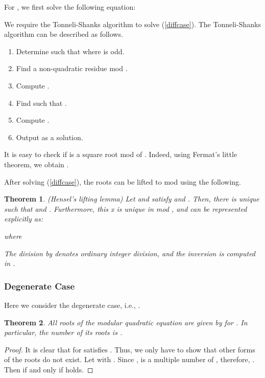 \documentclass{article}
\newtheorem{thm}{Theorem}
\begin{document}
For , we first solve the following equation:


We require the Tonneli-Shanks algorithm to solve (\ref{diffcase}). 
The Tonneli-Shanks algorithm can be described as follows.

{\small
\begin{enumerate}
\item Determine  such that  where  is odd.
\item Find a non-quadratic residue  mod .
\item Compute .
\item Find  such that .
\item Compute .
\item Output  as a solution.
\end{enumerate}
}
It is easy to check if  is a square root mod  of . 
Indeed, using Fermat's little theorem, we obtain 
.

After solving (\ref{diffcase}), the roots can be lifted to mod  using the following.

\begin{thm}(Hensel's lifting lemma) 
Let  and  satisfy 
 and .
Then, there is unique  such that  
and . 
Furthermore, this x is unique in mod , and can be represented explicitly as:

where

The division by  denotes ordinary integer division, 
and the inversion  is computed in .
\end{thm}

\subsubsection{Degenerate Case}
Here we consider the degenerate case, i.e., .

\begin{thm}\label{zerothm}
All roots of the modular quadratic equation  are given by
 for . 
In particular, the number of its roots is .
\end{thm}
\begin{proof} It is clear that  for  satisfies 
. 
Thus, we only have to show that other forms of the roots do not exist. 
Let  with . Since ,  is a multiple number of , 
therefore, . 
Then  if and only if  holds.
\end{proof}
\end{document}
